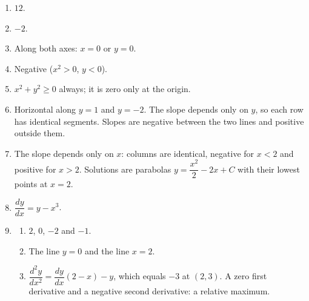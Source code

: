 \documentclass[11pt]{article}
\begin{document}
\newpage
\begin{solbox}
\begin{enumerate}[leftmargin=*,itemsep=4pt]
  \item $12$.
  \item $-2$.
  \item Along both axes: $x=0$ or $y=0$.
  \item Negative ($x^2>0$, $y<0$).
  \item $x^2+y^2\ge0$ always; it is zero only at the origin.
  \item Horizontal along $y=1$ and $y=-2$. The slope depends only on $y$, so each row has identical segments. Slopes are negative between the two lines and positive outside them.
  \item The slope depends only on $x$: columns are identical, negative for $x<2$ and positive for $x>2$. Solutions are parabolas $y=\dfrac{x^2}{2}-2x+C$ with their lowest points at $x=2$.
  \item $\dfrac{dy}{dx}=y-x^3$.
  \item \begin{enumerate}[label=(\alph*),leftmargin=*,itemsep=3pt]
    \item $2$, $0$, $-2$ and $-1$.
    \item The line $y=0$ and the line $x=2$.
    \item $\dfrac{d^2y}{dx^2}=\dfrac{dy}{dx}(2-x)-y$, which equals $-3$ at $(2,3)$. A zero first derivative and a negative second derivative: a relative maximum.
  \end{enumerate}
\end{enumerate}
\end{solbox}
\end{document}

